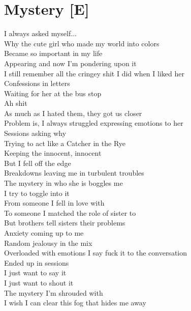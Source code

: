 \documentclass[12pt, b5paper, oneside]{book}
\begin{document}
\section{Mystery [E]}
I always asked myself...
\\Why the cute girl who made my world into colors
\\Became so important in my life
\\Appearing and now I'm pondering upon it
\\I still remember all the cringey shit I did when I liked her
\\Confessions in letters
\\Waiting for her at the bus stop
\\Ah shit
\\As much as I hated them, they got us closer
\\Problem is, I always struggled expressing emotions to her
\\Sessions asking why
\\Trying to act like a Catcher in the Rye
\\Keeping the innocent, innocent
\\But I fell off the edge
\\Breakdowns leaving me in turbulent troubles
\\The mystery in who she is boggles me
\\I try to toggle into it
\\From someone I fell in love with
\\To someone I matched the role of sister to
\\But brothers tell sisters their problems
\\Anxiety coming up to me
\\Random jealousy in the mix
\\Overloaded with emotions I say fuck it to the conversation
\\Ended up in sessions
\\I just want to say it
\\I just want to shout it
\\The mystery I'm shrouded with
\\I wish I can clear this fog that hides me away 
\newpage
\end{document}
